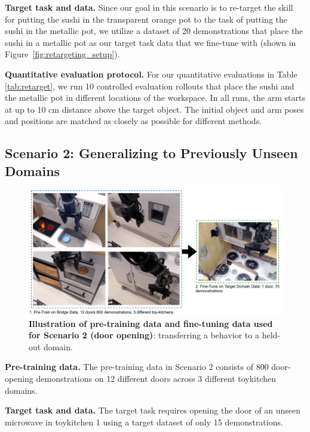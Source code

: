\documentclass[../thesis.tex]{subfiles}
\begin{document}
\textbf{Target task and data.} Since our goal in this scenario is to re-target the skill for putting the sushi in the transparent orange pot to the task of putting the sushi in the metallic pot, we utilize a dataset of 20 demonstrations that place the sushi in a metallic pot as our target task data that we fine-tune with (shown in Figure~\ref{fig:retargeting_setup}). 

\textbf{Quantitative evaluation protocol.} For our quantitative evaluations in Table \ref{tab:retarget}, we run 10 controlled evaluation rollouts that place the sushi and the metallic pot in different locations of the workspace. In all runs, the arm starts at up to 10 cm distance above the target object. The initial object and arm poses and positions are matched as closely as possible for different methods.

\subsection{Scenario 2: Generalizing to Previously Unseen Domains}

\begin{figure}
\centering
  \includegraphics[width=0.83\linewidth]{chapters/ptr/scenario2_overview.pdf}
  \caption{\footnotesize \textbf{Illustration of pre-training data and fine-tuning data used for Scenario 2 (door opening)}: transferring a behavior to a held-out domain.}
  \vspace{-0.5cm}
  \label{fig:door_open_setup}
\end{figure}


\textbf{Pre-training data.} The pre-training data in Scenario 2 consists of 800 door-opening demonstrations on 12 different doors across 3 different toykitchen domains.

\textbf{Target task and data.} The target task requires opening the door of an unseen microwave in toykitchen 1 using a target dataset of only 15 demonstrations.
\end{document}
